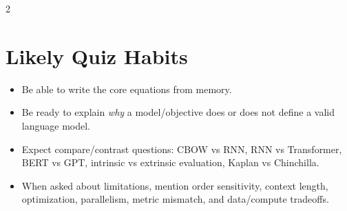 \documentclass[10pt]{article}
\begin{document}
\begin{multicols*}{2}
\section*{Likely Quiz Habits}
\begin{itemize}
\item Be able to write the core equations from memory.
\item Be ready to explain \emph{why} a model/objective does or does not define a valid language model.
\item Expect compare/contrast questions: CBOW vs RNN, RNN vs Transformer, BERT vs GPT, intrinsic vs extrinsic evaluation, Kaplan vs Chinchilla.
\item When asked about limitations, mention order sensitivity, context length, optimization, parallelism, metric mismatch, and data/compute tradeoffs.
\end{itemize}

\end{multicols*}
\end{document}
